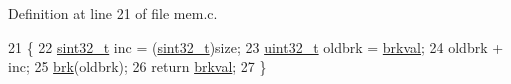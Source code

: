 Definition at line 21 of file mem.\+c.


\begin{DoxyCode}
21                         \{
22     \hyperlink{a00140_ad838970452fe561cb8e0550cac5336be_ad838970452fe561cb8e0550cac5336be}{sint32\_t} inc = (\hyperlink{a00140_ad838970452fe561cb8e0550cac5336be_ad838970452fe561cb8e0550cac5336be}{sint32\_t})size;
23     \hyperlink{a00140_a435d1572bf3f880d55459d9805097f62_a435d1572bf3f880d55459d9805097f62}{uint32\_t} oldbrk = \hyperlink{a00167_a33fb44061f3432e7d04085bcef339974_a33fb44061f3432e7d04085bcef339974}{brkval};
24     oldbrk + inc;
25     \hyperlink{a00167_a46e79822750a4396759664ee0012b283_a46e79822750a4396759664ee0012b283}{brk}(oldbrk);
26     \textcolor{keywordflow}{return} \hyperlink{a00167_a33fb44061f3432e7d04085bcef339974_a33fb44061f3432e7d04085bcef339974}{brkval};
27 \}
\end{DoxyCode}
